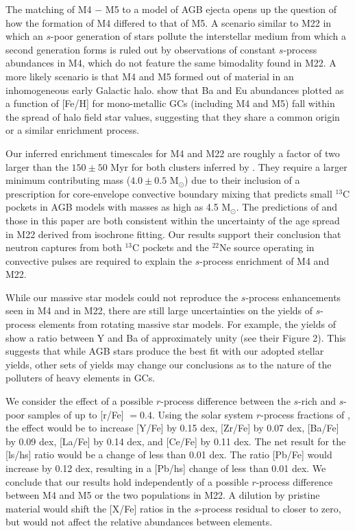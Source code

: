 The matching of M4 $-$ M5 to a model of AGB ejecta opens up the question of how the formation of M4 differed to that of M5. A scenario similar to M22 in which an $s$-poor generation of stars pollute the interstellar medium from which a second generation forms is ruled out by observations of constant $s$-process abundances in M4, which do not feature the same bimodality found in M22. A more likely scenario is that M4 and M5 formed out of material in an inhomogeneous early Galactic halo. \citet{James:2004br} show that Ba and Eu abundances plotted as a function of [Fe/H] for mono-metallic GCs (including M4 and M5) fall within the spread of halo field star values, suggesting that they share a common origin or a similar enrichment process.

Our inferred enrichment timescales for M4 and M22 are roughly a factor of two larger than the $150 \pm 50$ Myr for both clusters inferred by \citet{Straniero:2014jk}. They require a larger minimum contributing mass ($4.0 \pm 0.5$ M$_\odot$) due to their inclusion of a prescription for core-envelope convective boundary mixing \citep{Cristallo:2009kn} that predicts small $^{13}$C pockets in AGB models with masses as high as 4.5 M$_\odot$. The predictions of \citet{Straniero:2014jk} and those in this paper are both consistent within the uncertainty of the age spread in M22 derived from isochrone fitting. Our results support their conclusion that neutron captures from both $^{13}$C pockets and the $^{22}$Ne source operating in convective pulses are required to explain the $s$-process enrichment of M4 and M22.

While our massive star models could not reproduce the $s$-process enhancements seen in M4 and in M22, there are still large uncertainties on the yields of $s$-process elements from rotating massive star models. For example, the yields of \citet{Pignatari:2008ec} show a ratio between Y and Ba of approximately unity (see their Figure 2). This suggests that while AGB stars produce the best fit with our adopted stellar yields, other sets of yields may change our conclusions as to the nature of the polluters of heavy elements in GCs.

We consider the effect of a possible $r$-process difference between the $s$-rich and $s$-poor samples of up to [r/Fe] $=0.4$. Using the solar system $r$-process fractions of \citet{Simmerer:2004ib}, the effect would be to increase [Y/Fe] by 0.15 dex, [Zr/Fe] by 0.07 dex, [Ba/Fe] by 0.09 dex, [La/Fe] by 0.14 dex, and [Ce/Fe] by 0.11 dex. The net result for the [ls/hs] ratio would be a change of less than 0.01 dex. The ratio [Pb/Fe] would increase by 0.12 dex, resulting in a [Pb/hs] change of less than 0.01 dex. We conclude that our results hold independently of a possible $r$-process difference between M4 and M5 or the two populations in M22. A dilution by pristine material would shift the [X/Fe] ratios in the $s$-process residual to closer to zero, but would not affect the relative abundances between elements.

